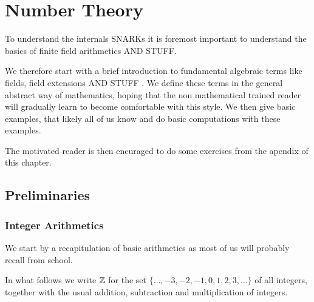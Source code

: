 \chapter{Number Theory}

To understand the internals SNARKs it is foremost important to understand the basics of finite field arithmetics AND STUFF.

We therefore start with a brief introduction to fundamental algebraic terms like fields, field extensions AND STUFF . We define these terms in the general abstract way of mathematics, hoping that the non mathematical trained reader will gradually learn to become comfortable with this style. We then give basic examples, that likely all of us know and do basic computations with these examples. 

The motivated reader is then encuraged to do some exercises from  the apendix of this chapter.

\section{Preliminaries}

\subsection{Integer Arithmetics}
\label{integer_arithmetics}
We start by a recapitulation of basic arithmetics as most of us will probably recall from school.

In what follows we write $\mathbb{Z}$ for the set $\{\ldots, -3,-2,-1,0,1,2,3,\ldots\}$ of all integers, together with the usual addition, subtraction and multiplication of integers.

